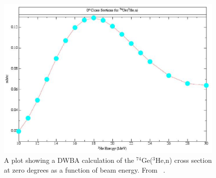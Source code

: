 \begin{figure}[hp]
\centering
\includegraphics[width=1.0\textwidth]{figures/74Ge_0plus_xsection.eps}
\caption[The $^{74}$Ge($^3$He,n) \zp cross section at zero degrees as a function of beam energy.]{A plot showing a DWBA calculation of the $^{74}$Ge($^3$He,n) \zp cross section at zero degrees as a function of beam energy.  From {}~\citep{schiffer_privateCommunication}.}
\label{fig:optimizeCrossSection}
\end{figure}

